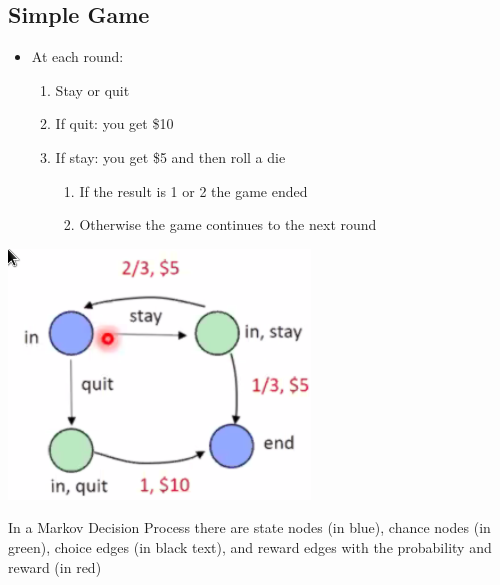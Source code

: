 \documentclass[11pt]{article}
\begin{document}
\subsection{Simple Game}
\label{sec:orgb273905}
\begin{itemize}
\item At each round:
\begin{enumerate}
\item Stay or quit
\item If quit: you get \$10
\item If stay: you get \$5 and then roll a die
\begin{enumerate}
\item If the result is 1 or 2 the game ended
\item Otherwise the game continues to the next round
\end{enumerate}
\end{enumerate}
\end{itemize}
\begin{center}
\includegraphics[width=.9\linewidth]{images/2020-09-03_18-02-27_screenshot.png}
\end{center}
In a Markov Decision Process there are state nodes (in blue), chance nodes (in green), choice edges (in black text), and reward edges with the probability and reward (in red)
\end{document}
